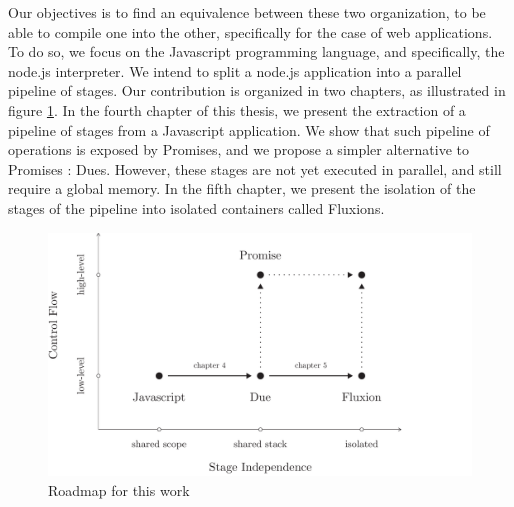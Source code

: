 Our objectives is to find an equivalence between these two organization, to be able to compile one into the other, specifically for the case of web applications.
To do so, we focus on the Javascript programming language, and specifically, the node.js interpreter.
We intend to split a node.js application into a parallel pipeline of stages.
Our contribution is organized in two chapters, as illustrated in figure \ref{fig:chapter3:objectives:roadmap}.
In the fourth chapter of this thesis, we present the extraction of a pipeline of stages from a Javascript application.
We show that such pipeline of operations is exposed by Promises, and we propose a simpler alternative to Promises : Dues.
However, these stages are not yet executed in parallel, and still require a global memory.
In the fifth chapter, we present the isolation of the stages of the pipeline into isolated containers called Fluxions. 

\begin{figure}[h!]
\includegraphics[width=1\textwidth]{../ressources/roadmap.pdf}
\caption{Roadmap for this work}
\label{fig:chapter3:objectives:roadmap}
\end{figure}

\endinput

We show that there is no languages that features higher-order functions to improve modularity, a common memory store easy to develop with, but at the same time provides scalable concurrency.

We aim at filling this gap, and for a concrete example, focus our work on the Javascript programing language.
Indeed, Javascript features higher-order functions, is highly-used in concurrent context, but lacks scalable concurrency.

Our work is divided into two contributions: Due and Fluxions.

-> Schema roadmap.